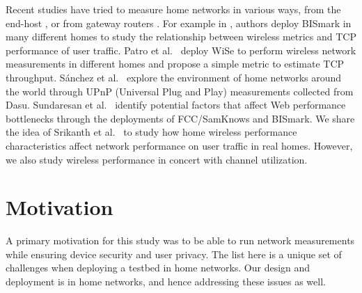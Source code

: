 Recent studies have tried to measure home networks in various ways, from the end-host \cite{chetty2011my,dicioccio2012probe,sanchez2013trying}, or from gateway routers \cite{grover2013peeking,sundaresan2015measuring,patro2013observing,sundaresan2013measuring,pefkianakis2015characterizing}. For example in \cite{sundaresan2015measuring}, authors deploy BISmark in many different homes to study the relationship between wireless metrics and TCP performance of user traffic. Patro et al.~\cite{patro2013observing} deploy WiSe to perform wireless network measurements in different homes and propose a simple metric to estimate TCP throughput. S{\'a}nchez et al.~\cite{sanchez2013trying} explore the environment of home networks around the world through UPnP (Universal Plug and Play) measurements collected from Dasu. Sundaresan et al.~\cite{sundaresan2013measuring} identify potential factors that affect Web performance bottlenecks through the deployments of FCC/SamKnows and BISmark. We share the idea of Srikanth et al.~\cite{sundaresan2015measuring} to study how home wireless performance characteristics affect network performance on user traffic in real homes. However, we also study wireless performance in concert with channel utilization.

\section{Motivation}
\label{sec.motivation}
A primary motivation for this study was to be able to run network measurements while ensuring device security and user privacy. The list here is a unique set of challenges when deploying a testbed in home networks. Our design and deployment is in home networks, and hence addressing these issues as well.

